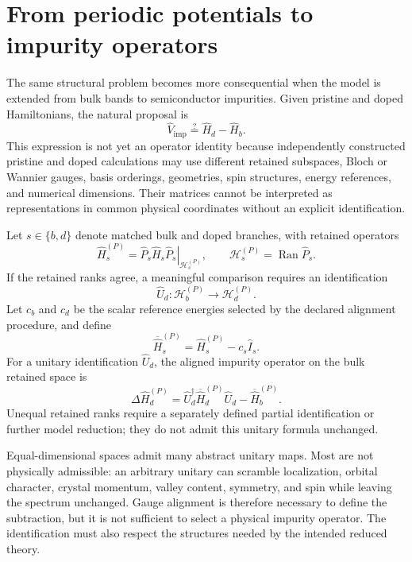 \section{From periodic potentials to impurity operators}


The same structural problem becomes more consequential when the model is
extended from bulk bands to semiconductor impurities. Given pristine and doped
Hamiltonians, the natural proposal is
\begin{equation}
    \hat V_{\mathrm{imp}}
    \stackrel{?}{=}
    \hat H_d-\hat H_b.
\end{equation}
This expression is not yet an operator identity because independently
constructed pristine and doped calculations may use different retained
subspaces, Bloch or Wannier gauges, basis orderings, geometries, spin
structures, energy references, and numerical dimensions. Their matrices cannot
be interpreted as representations in common physical coordinates without an
explicit identification.

Let $s\in\{b,d\}$ denote matched bulk and doped branches, with retained
operators
\begin{equation}
    \hat H_s^{(P)}
    =
    \left.
        \hat P_s\hat H_s\hat P_s
    \right|_{\mathcal H_s^{(P)}},
    \qquad
    \mathcal H_s^{(P)}
    =
    \operatorname{Ran}\hat P_s.
\end{equation}
If the retained ranks agree, a meaningful comparison requires an
identification
\begin{equation}
    \hat U_d:
    \mathcal H_b^{(P)}
    \longrightarrow
    \mathcal H_d^{(P)}.
\end{equation}
Let $c_b$ and $c_d$ be the scalar reference energies selected by the declared
alignment procedure, and define
\begin{equation}
    \overline{\hat H}_s^{(P)}
    =
    \hat H_s^{(P)}-c_s\hat I_s.
\end{equation}
For a unitary identification $\hat U_d$, the aligned impurity operator on the
bulk retained space is
\begin{equation}
    \Delta\hat H_d^{(P)}
    =
    \hat U_d^\dagger
    \overline{\hat H}_d^{(P)}
    \hat U_d
    -
    \overline{\hat H}_b^{(P)}.
\end{equation}
Unequal retained ranks require a separately defined partial identification or
further model reduction; they do not admit this unitary formula unchanged.

Equal-dimensional spaces admit many abstract unitary maps. Most are not
physically admissible: an arbitrary unitary can scramble localization, orbital
character, crystal momentum, valley content, symmetry, and spin while leaving
the spectrum unchanged. Gauge alignment is therefore necessary to define the
subtraction, but it is not sufficient to select a physical impurity operator.
The identification must also respect the structures needed by the intended
reduced theory.

